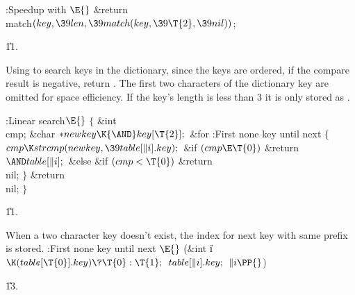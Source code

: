 \B{}:Speedup with \X${}\E{}$\6
\&{return} \\{match}${}(\\{key},\39\\{len},\39\\{match}(\\{key},\39\T{2},\39%
\\{nil})){}$;\par
\U11.\fi

Using  to search keys in the dictionary, since the keys
are
ordered, if the compare result is negative, return . The first
two characters of the dictionary key are omitted for space efficiency.
If the key's length is less than 3 it is only stored as .

\Y\B\4:Linear search\X${}\E{}$\6
${}\{{}$\1\6
\&{int} \\{cmp};\6
\&{char} ${}{*}\\{newkey}\K{\AND}\\{key}[\T{2}];{}$\7
\&{for} :First none  key until next \X\5
${}\{{}$\1\6
${}\\{cmp}\K\\{strcmp}(\\{newkey},\39\\{table}[\|i].\\{key});{}$\6
\&{if} ${}(\\{cmp}\E\T{0}){}$\1\5
\&{return} ${}{\AND}\\{table}[\|i];{}$\2\6
\&{else} \&{if} ${}(\\{cmp}<\T{0}){}$\1\5
\&{return} \\{nil};\2\6
\4${}\}{}$\2\6
\&{return} \\{nil};\6
\4${}\}{}$\2\par
\U11.\fi

When a two character key doesn't exist, the index for next key with
same prefix is stored.
\Y\B\4:First none  key until next \X${}\E{}$\6
(\&{int} \|i${}\K(\\{table}[\T{0}].\\{key})\?\T{0}:\T{1};{}$ ${}\\{table}[\|i].%
\\{key};{}$ ${}\|i\PP{}$)\par
\U13.\fi

